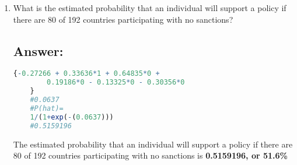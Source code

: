 \documentclass[12pt,letterpaper]{article}
\begin{document}
\begin{enumerate}
\begin{enumerate}
		\subsection*{Answer:}
		
		To answer this I will use the regression equation, for logistic regression, in R.
		\begin{lstlisting}[language=R]
{-0.27266 + 0.33636*0 + 0.64835*1 +
	0.19186*1 - 0.13325*0 - 0.30356*0
}
#countries_160 = 1, sanctions_5 = 1.
#0.56755
#P(hat)=
1/(1+exp(-(0.56755)))
#0.6381977

{-0.27266 + 0.33636*0 + 0.64835*1 +
	0.19186*0 - 0.13325*1 - 0.30356*0 
}
#countries_160 = 1, sanctions_15 = 1.
#0.24244
#P(hat) = 
1/(1+exp(-(0.24244)))
#0.5603149

0.6381977 - 0.5603149
#0.0778828
		\end{lstlisting}
		
		\vspace{0.5cm}
		
		Increasing the sanctions from 5\% to 15\% (when 160 out of 192 countries participate) equates to a decrease in the probability that an individual will support the policy \textbf{= 0.0778828, or 7.8\%}.
		
		\vspace{0.5cm}
		\item
		What is the estimated probability that an individual will support a policy if there are 80 of 192 countries participating with no sanctions? 
		
		\subsection*{Answer:}
		
		\begin{lstlisting}[language=R]
	{-0.27266 + 0.33636*1 + 0.64835*0 +
		0.19186*0 - 0.13325*0 - 0.30356*0 
	}
	#0.0637
	#P(hat)=
	1/(1+exp(-(0.0637)))
	#0.5159196
		\end{lstlisting}
		
		\vspace{0.5cm}
		
		The estimated probability that an individual will support a policy if there are 80 of 192 countries participating with no sanctions is \textbf{0.5159196, or 51.6\%}
		

\end{enumerate}
\end{enumerate}
\end{document}
